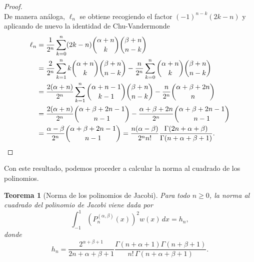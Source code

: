 \documentclass[12pt,a4paper]{book}
\newtheorem{theorem}{Teorema}
\begin{document}
\begin{proof}
\[\]
De manera análoga, $\ell_n$ se obtiene recogiendo el factor $(-1)^{n-k}(2k-n)$ y aplicando de nuevo la identidad de Chu-Vandermonde
\begin{align*}
    \ell_n &= \frac{1}{2^n} \sum_{k=0}^n (2k-n) \binom{\alpha + n}{k} \binom{\beta + n}{n-k} \\
    &= \frac{2}{2^n} \sum_{k=1}^n k \binom{\alpha + n}{k} \binom{\beta + n}{n-k} - \frac{n}{2^n} \sum_{k=0}^n \binom{\alpha + n}{k} \binom{\beta + n}{n-k}\\
    &= \frac{2(\alpha + n)}{2^n} \sum_{k=1}^n \binom{\alpha+n-1}{k-1} \binom{\beta + n}{n-k} - \frac{n}{2^n} \binom{\alpha+\beta+2n}{n}\\
    &= \frac{2(\alpha + n)}{2^n} \binom{\alpha+\beta+2n-1}{n-1} - \frac{\alpha+\beta+2n}{2^n}\binom{\alpha+\beta+2n-1}{n-1}\\
    &= \frac{\alpha-\beta}{2^n} \binom{\alpha+\beta+2n-1}{n-1} = \frac{n(\alpha-\beta)}{2^n n!} \frac{\Gamma(2n+\alpha+\beta)}{\Gamma(n+\alpha+\beta+1)}.
    \qedhere
\end{align*}
\end{proof}

Con este resultado, podemos proceder a calcular la norma al cuadrado de los polinomios.

\begin{theorem}[Norma de los polinomios de Jacobi]
\label{teo:norma_jacobi}
Para todo $n \ge 0$, la norma al cuadrado del polinomio de Jacobi viene dada por
\[
    \int_{-1}^{1} (P_n^{(\alpha, \beta)}(x))^2 w(x) \, dx = h_n,
\]
donde
\begin{equation}
    \label{eq:norma_jacobi}
    h_n = \frac{2^{\alpha+\beta+1}}{2n+\alpha+\beta+1} \frac{\Gamma(n+\alpha+1)\Gamma(n+\beta+1)}{n! \,\Gamma(n+\alpha+\beta+1)}.
\end{equation}
\end{theorem}
\end{document}
